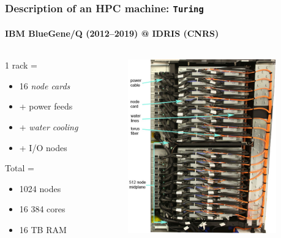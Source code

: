 \documentclass[xcolor={x11names,svgnames,psnames}]{beamer}
\begin{document}
\begin{frame}
  \frametitle{Description of an HPC machine: \texttt{Turing}}
  \framesubtitle{IBM BlueGene/Q (2012--2019) @ IDRIS (CNRS)}
  
  \begin{columns}
    \begin{column}{0.33\textwidth}
      1 rack =
      \begin{itemize}
      \item 16 \textit{node cards}
      \item + power feeds
      \item + \textit{water cooling}
      \item + I/O nodes
      \end{itemize}

      \bigskip
      
      Total =
      \begin{itemize}
      \item 1024 nodes
      \item 16 384 cores
      \item 16 TB RAM
      \end{itemize}
      
    \end{column}
      
    \begin{column}{0.66\textwidth}
      \includegraphics[height=7.5cm]{bgqMidplane}
    \end{column}
  \end{columns}
\end{frame}

\end{document}
